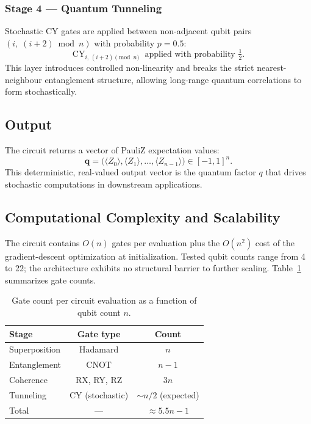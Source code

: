 \documentclass[twocolumn,amsmath,amssymb,prl]{revtex4-2}
\begin{document}
\subsubsection{Stage 4 — Quantum Tunneling}

Stochastic CY gates are applied between non-adjacent qubit pairs $(i,\;
(i+2) \bmod n)$ with probability $p = 0.5$:
\begin{equation}
  \text{CY}_{i,\,(i+2)\!\!\!\pmod{n}}
  \;\text{ applied with probability }\tfrac{1}{2}.
\end{equation}
This layer introduces controlled non-linearity and breaks the strict
nearest-neighbour entanglement structure, allowing long-range quantum
correlations to form stochastically.

\subsection{Output}

The circuit returns a vector of PauliZ expectation values:
\begin{equation}
  \mathbf{q} = \bigl(\langle Z_0 \rangle, \langle Z_1 \rangle, \ldots,
                     \langle Z_{n-1} \rangle\bigr) \in [-1,1]^n.
\end{equation}
This deterministic, real-valued output vector is the quantum factor $q$ that
drives stochastic computations in downstream applications.

\subsection{Computational Complexity and Scalability}

The circuit contains $O(n)$ gates per evaluation plus the $O(n^2)$ cost of
the gradient-descent optimization at initialization.  Tested qubit counts
range from 4 to 22; the architecture exhibits no structural barrier to further
scaling.  Table~\ref{tab:complexity} summarizes gate counts.

\begin{table}[h]
\centering
\caption{Gate count per circuit evaluation as a function of qubit count $n$.}
\label{tab:complexity}
\begin{tabular}{lcc}
\toprule
Stage & Gate type & Count \\
\midrule
Superposition & Hadamard & $n$ \\
Entanglement  & CNOT     & $n-1$ \\
Coherence     & RX, RY, RZ & $3n$ \\
Tunneling     & CY (stochastic) & $\sim n/2$ (expected) \\
\midrule
Total & — & $\approx 5.5n - 1$ \\
\bottomrule
\end{tabular}
\end{table}
\end{document}

